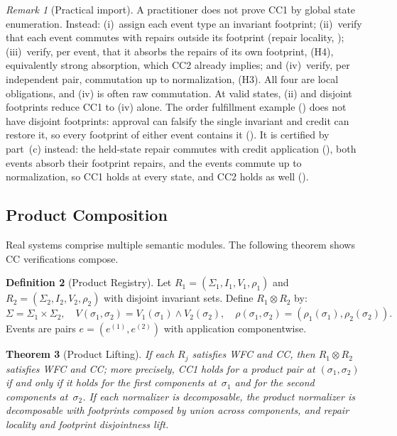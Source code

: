 \documentclass[11pt,a4paper]{article}
\theoremstyle{plain}
\newtheorem{theorem}{Theorem}[section]
\theoremstyle{definition}
\newtheorem{definition}[theorem]{Definition}
\theoremstyle{remark}
\newtheorem{remark}[theorem]{Remark}
\renewcommand{\_}{\textunderscore\allowbreak}
\begin{document}
\begin{remark}[Practical import]
\label{rem:practical-import}
A practitioner does not prove CC1 by global state enumeration.  Instead:
(i)~assign each event type an invariant footprint; (ii)~verify that each
event commutes with repairs outside its footprint (repair locality,
); (iii)~verify, per event, that it absorbs the
repairs of its own footprint, (H4), equivalently strong absorption, which CC2
already implies; and (iv)~verify, per independent pair, commutation up to
normalization, (H3).  All four are local obligations, and (iv) is often raw
commutation.  At valid states, (ii) and disjoint footprints reduce CC1 to
(iv) alone.  The order fulfillment example () does not have
disjoint footprints: approval can falsify the single invariant and credit can
restore it, so every footprint of either event contains it
().  It is certified by part~(c)
instead: the held-state repair commutes with credit application
(), both events absorb their footprint
repairs, and the events commute up to normalization, so CC1 holds at every
state, and CC2 holds as well ().
\end{remark}

\subsection{Product Composition}

Real systems comprise multiple semantic modules.  The following theorem shows
CC verifications compose.

\begin{definition}[Product Registry]
\label{def:product}
Let $R_1 = (\Sigma_1, I_1, V_1, \rho_1)$ and $R_2 = (\Sigma_2, I_2, V_2,
\rho_2)$ with disjoint invariant sets.  Define $R_1 \otimes R_2$ by:
\[
\Sigma = \Sigma_1 \times \Sigma_2, \quad
V(\sigma_1, \sigma_2) = V_1(\sigma_1) \wedge V_2(\sigma_2), \quad
\rho(\sigma_1, \sigma_2) = (\rho_1(\sigma_1), \rho_2(\sigma_2)).
\]
Events are pairs $e = (e^{(1)}, e^{(2)})$ with application componentwise.
\end{definition}

\begin{theorem}[Product Lifting]
\label{thm:product}
If each $R_j$ satisfies WFC and CC, then $R_1 \otimes R_2$ satisfies WFC and
CC; more precisely, CC1 holds for a product pair at $(\sigma_1, \sigma_2)$ if
and only if it holds for the first components at~$\sigma_1$ and for the
second components at~$\sigma_2$.  If each normalizer is decomposable, the
product normalizer is decomposable with footprints composed by union across
components, and repair locality and footprint disjointness lift.
\end{theorem}
\end{document}

